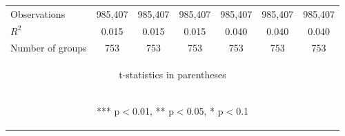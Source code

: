 \documentclass[]{article}
\begin{document}
\begin{center}
\begin{tabular}{lcccccc}
Observations & 985,407 & 985,407 & 985,407 & 985,407 & 985,407 & 985,407 \\
$R^2$ & 0.015 & 0.015 & 0.015 & 0.040 & 0.040 & 0.040 \\
 Number of groups & 753 & 753 & 753 & 753 & 753 & 753 \\ \hline
\multicolumn{7}{c}{\begin{footnotesize} t-statistics in parentheses\end{footnotesize}} \\
\multicolumn{7}{c}{\begin{footnotesize} *** p$<$0.01, ** p$<$0.05, * p$<$0.1\end{footnotesize}} \\
\end{tabular}
\end{center}
\end{document}

